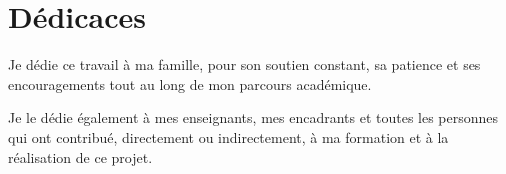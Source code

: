 \chapter*{Dédicaces}

Je dédie ce travail à ma famille, pour son soutien constant, sa patience et ses encouragements tout au long de mon parcours académique.

Je le dédie également à mes enseignants, mes encadrants et toutes les personnes qui ont contribué, directement ou indirectement, à ma formation et à la réalisation de ce projet.

\clearpage
